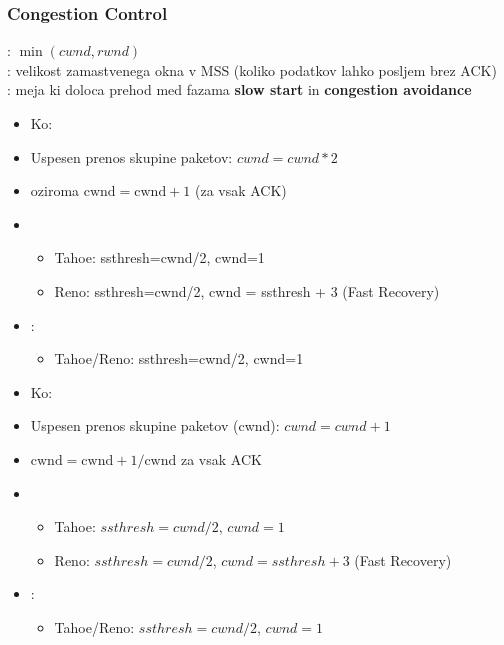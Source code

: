 \subsubsection{Congestion Control}
: $\min(cwnd, rwnd)$\\
: velikost zamastvenega okna v MSS (koliko podatkov lahko posljem brez ACK)\\
: meja ki doloca prehod med fazama \textbf{slow start} in \textbf{congestion avoidance}\\
\begin{itemize}[leftmargin=*, noitemsep]
    \item Ko: 
    \item Uspesen prenos skupine paketov: $cwnd = cwnd * 2$
    \item oziroma $\text{cwnd}=\text{cwnd}+1$ (za vsak ACK)
    \item {}\begin{itemize}[leftmargin=*]
        \item Tahoe: ssthresh=cwnd/2, cwnd=1    
        \item Reno: ssthresh=cwnd/2, cwnd = ssthresh + 3 (Fast Recovery)
    \end{itemize}
    \item {}:\begin{itemize}[leftmargin=*]
        \item Tahoe/Reno: ssthresh=cwnd/2, cwnd=1
    \end{itemize}
\end{itemize}
\begin{itemize}[leftmargin=*, noitemsep]
    \item Ko: 
    \item Uspesen prenos skupine paketov (cwnd): $cwnd = cwnd + 1$
    \item $\text{cwnd}=\text{cwnd} + 1/\text{cwnd}$ za vsak ACK
    \item {}\begin{itemize}[leftmargin=*]
        \item Tahoe: $ssthresh=cwnd/2$, $cwnd=1$
        \item Reno: $ssthresh=cwnd/2$, $cwnd = ssthresh + 3$ (Fast Recovery)
    \end{itemize}
    \item {}:\begin{itemize}[leftmargin=*]
        \item Tahoe/Reno: $ssthresh=cwnd/2$, $cwnd=1$
    \end{itemize}
\end{itemize}




